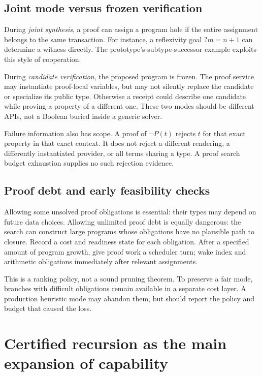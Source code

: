 \documentclass[11pt,letterpaper]{article}
\theoremstyle{definition}\newtheorem{definition}[theorem]{Definition}
\theoremstyle{remark}\newtheorem{remark}[theorem]{Remark}
\begin{document}
\subsection{Joint mode versus frozen verification}

During \emph{joint synthesis}, a proof can assign a program hole if the entire
assignment belongs to the same transaction. For instance, a reflexivity goal
$?m=n+1$ can determine a witness directly. The prototype's subtype-successor
example exploits this style of cooperation.

During \emph{candidate verification}, the proposed program is frozen. The proof
service may instantiate proof-local variables, but may not silently replace the
candidate or specialize its public type. Otherwise a receipt could describe one
candidate while proving a property of a different one. These two modes should
be different APIs, not a Boolean buried inside a generic solver.

Failure information also has scope. A proof of $\neg P(t)$ rejects $t$ for that
exact property in that exact context. It does not reject a different rendering,
a differently instantiated provider, or all terms sharing a type. A proof search
budget exhaustion supplies no such rejection evidence.

\subsection{Proof debt and early feasibility checks}

Allowing some unsolved proof obligations is essential: their types may depend on
future data choices. Allowing unlimited proof debt is equally dangerous: the
search can construct large programs whose obligations have no plausible path to
closure. Record a cost and readiness state for each obligation. After a specified
amount of program growth, give proof work a scheduler turn; wake index and
arithmetic obligations immediately after relevant assignments.

This is a ranking policy, not a sound pruning theorem. To preserve a fair mode,
branches with difficult obligations remain available in a separate cost layer.
A production heuristic mode may abandon them, but should report the policy and
budget that caused the loss.

\section{Certified recursion as the main expansion of capability}
\label{sec:recursion}
\end{document}
